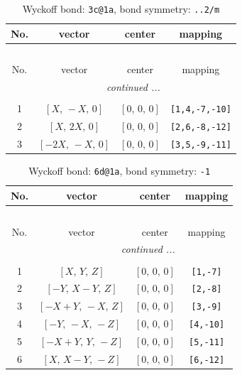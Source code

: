 \documentclass[fleqn,8pt]{jsarticle}
\begin{document}
\renewcommand{\arraystretch}{1.2}
\begin{longtable}{cccc}
\caption{Wyckoff bond: {\tt 3c@1a}, bond symmetry: {\tt ..2/m}}
 \\
 \hline \hline
No. & vector & center & mapping \\ \hline \endfirsthead

\multicolumn{3}{l}{\tablename\ \thetable{}} \\
 \hline \hline
No. & vector & center & mapping \\ \hline \endhead

 \hline \hline
\multicolumn{3}{r}{\footnotesize\it continued ...} \\ \endfoot

 \hline \hline
\multicolumn{3}{r}{} \\ \endlastfoot

1 & $\left[ X,\, - X,\, 0 \right]$ & $\left[ 0,\, 0,\, 0 \right]$ & {\tt [1,4,-7,-10]} \\ \hline
2 & $\left[ X,\, 2 X,\, 0 \right]$ & $\left[ 0,\, 0,\, 0 \right]$ & {\tt [2,6,-8,-12]} \\ \hline
3 & $\left[ - 2 X,\, - X,\, 0 \right]$ & $\left[ 0,\, 0,\, 0 \right]$ & {\tt [3,5,-9,-11]} \\
\end{longtable}
\renewcommand{\arraystretch}{1.2}
\begin{longtable}{cccc}
\caption{Wyckoff bond: {\tt 6d@1a}, bond symmetry: {\tt -1}}
 \\
 \hline \hline
No. & vector & center & mapping \\ \hline \endfirsthead

\multicolumn{3}{l}{\tablename\ \thetable{}} \\
 \hline \hline
No. & vector & center & mapping \\ \hline \endhead

 \hline \hline
\multicolumn{3}{r}{\footnotesize\it continued ...} \\ \endfoot

 \hline \hline
\multicolumn{3}{r}{} \\ \endlastfoot

1 & $\left[ X,\, Y,\, Z \right]$ & $\left[ 0,\, 0,\, 0 \right]$ & {\tt [1,-7]} \\ \hline
2 & $\left[ - Y,\, X - Y,\, Z \right]$ & $\left[ 0,\, 0,\, 0 \right]$ & {\tt [2,-8]} \\ \hline
3 & $\left[ - X + Y,\, - X,\, Z \right]$ & $\left[ 0,\, 0,\, 0 \right]$ & {\tt [3,-9]} \\ \hline
4 & $\left[ - Y,\, - X,\, - Z \right]$ & $\left[ 0,\, 0,\, 0 \right]$ & {\tt [4,-10]} \\ \hline
5 & $\left[ - X + Y,\, Y,\, - Z \right]$ & $\left[ 0,\, 0,\, 0 \right]$ & {\tt [5,-11]} \\ \hline
6 & $\left[ X,\, X - Y,\, - Z \right]$ & $\left[ 0,\, 0,\, 0 \right]$ & {\tt [6,-12]} \\
\end{longtable}
\end{document}
